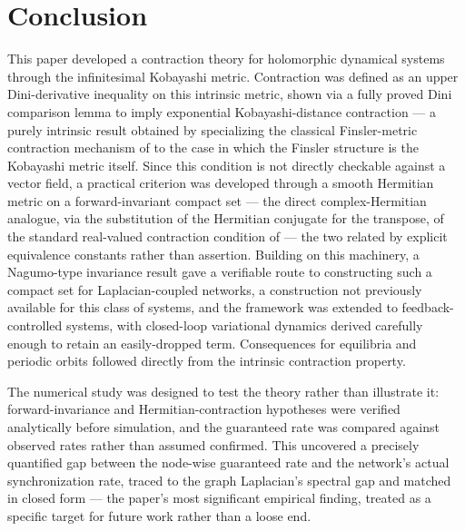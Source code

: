 \documentclass[preprint,12pt,authoryear]{elsarticle}
\begin{document}
%

\section{Conclusion}
\label{sec:conclusion}

This paper developed a contraction theory for holomorphic dynamical systems through the infinitesimal Kobayashi metric. Contraction was defined as an upper Dini-derivative inequality on this intrinsic metric, shown via a fully proved Dini comparison lemma to imply exponential Kobayashi-distance contraction --- a purely intrinsic result obtained by specializing the classical Finsler-metric contraction mechanism of \cite{forni2014differential} to the case in which the Finsler structure is the Kobayashi metric itself. Since this condition is not directly checkable against a vector field, a practical criterion was developed through a smooth Hermitian metric on a forward-invariant compact set --- the direct complex-Hermitian analogue, via the substitution of the Hermitian conjugate for the transpose, of the standard real-valued contraction condition of \cite{lohmiller1998contraction} --- the two related by explicit equivalence constants rather than assertion. Building on this machinery, a Nagumo-type invariance result gave a verifiable route to constructing such a compact set for Laplacian-coupled networks, a construction not previously available for this class of systems, and the framework was extended to feedback-controlled systems, with closed-loop variational dynamics derived carefully enough to retain an easily-dropped term. Consequences for equilibria and periodic orbits followed directly from the intrinsic contraction property.

The numerical study was designed to test the theory rather than illustrate it: forward-invariance and Hermitian-contraction hypotheses were verified analytically before simulation, and the guaranteed rate was compared against observed rates rather than assumed confirmed. This uncovered a precisely quantified gap between the node-wise guaranteed rate and the network's actual synchronization rate, traced to the graph Laplacian's spectral gap and matched in closed form --- the paper's most significant empirical finding, treated as a specific target for future work rather than a loose end.
\end{document}

